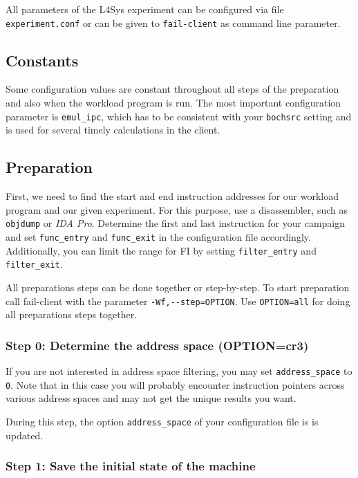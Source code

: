 \documentclass[a4paper,times,9pt]{article}
\newcommand{\lfs}{L4Sys}
\begin{document}
All parameters of the \lfs{} experiment can be configured via file
\texttt{experiment.conf} or can be given to \verb+fail-client+ as command
line parameter. 

\subsection{Constants}

Some configuration values are constant throughout all steps of the preparation 
and also when the workload program is run.  The most important configuration
parameter is \verb+emul_ipc+, which has to be consistent with your \texttt{bochsrc}
setting and is used for several timely calculations in the client.

\subsection{Preparation}

First, we need to find the start and end instruction addresses for our
workload program and our given experiment. For this purpose, use a
disassembler, such as \texttt{objdump} or \emph{IDA Pro}. Determine the first
and last instruction for your campaign and set  \verb+func_entry+ and
\verb+func_exit+ in the configuration file accordingly. Additionally, you
can limit the range for FI by setting \verb+filter_entry+ and \verb+filter_exit+.

All preparations steps can be done together or step-by-step. To start
preparation call fail-client with the parameter \verb+-Wf,--step=OPTION+.
Use \verb+OPTION=all+ for doing all preparations steps together.

\subsubsection{Step 0: Determine the address space (OPTION=cr3)}

If you are not interested in address space filtering, you may set
\verb+address_space+ to \verb+0+. Note that in this case you will
probably encounter instruction pointers across various address spaces and may
not get the unique results you want.

During this step, the option \verb+address_space+ of your configuration
file is is updated.


\subsubsection{Step 1: Save the initial state of the machine}
\end{document}
